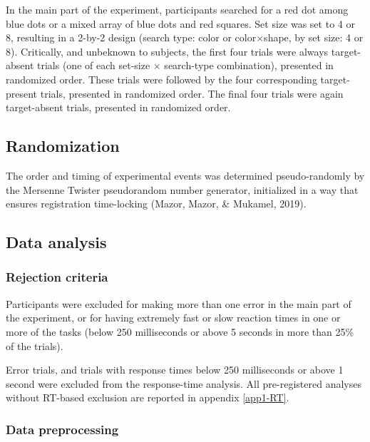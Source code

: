 \documentclass[12pt,twoside]{reedthesis}
\begin{document}
In the main part of the experiment, participants searched for a red dot among blue dots or a mixed array of blue dots and red squares. Set size was set to 4 or 8, resulting in a 2-by-2 design (search type: color or color\(\times\)shape, by set size: 4 or 8). Critically, and unbeknown to subjects, the first four trials were always target-absent trials (one of each set-size \(\times\) search-type combination), presented in randomized order. These trials were followed by the four corresponding target-present trials, presented in randomized order. The final four trials were again target-absent trials, presented in randomized order.

\hypertarget{randomization}{%
\subsection{Randomization}\label{randomization}}

The order and timing of experimental events was determined pseudo-randomly by the Mersenne Twister pseudorandom number generator, initialized in a way that ensures registration time-locking (Mazor, Mazor, \& Mukamel, 2019).

\hypertarget{data-analysis}{%
\subsection{Data analysis}\label{data-analysis}}

\hypertarget{rejection-criteria}{%
\subsubsection{Rejection criteria}\label{rejection-criteria}}

Participants were excluded for making more than one error in the main part of the experiment, or for having extremely fast or slow reaction times in one or more of the tasks (below 250 milliseconds or above 5 seconds in more than 25\% of the trials).

Error trials, and trials with response times below 250 milliseconds or above 1 second were excluded from the response-time analysis. All pre-registered analyses without RT-based exclusion are reported in appendix \ref{app1-RT}.

\hypertarget{data-preprocessing}{%
\subsubsection{Data preprocessing}\label{data-preprocessing}}
\end{document}

